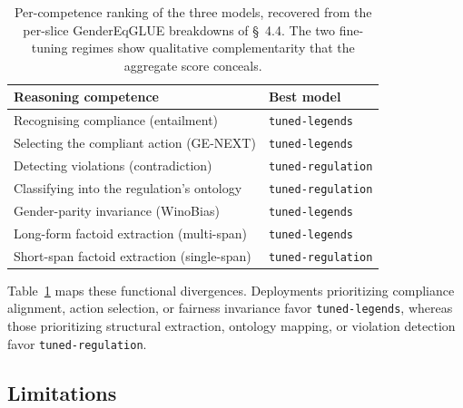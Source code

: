 \documentclass[pdflatex,sn-mathphys-num]{sn-jnl}%
\theoremstyle{thmstyleone}%
\theoremstyle{thmstyletwo}%
\theoremstyle{thmstylethree}%
\begin{document}
\begin{table}[htbp]
\centering
\caption{Per-competence ranking of the three models, recovered from the per-slice GenderEqGLUE breakdowns of \S~4.4. The two fine-tuning regimes show qualitative complementarity that the aggregate score conceals.}
\label{tab:competence_map}
\vspace{2mm}
\begin{tabular}{ll}
\toprule
\textbf{Reasoning competence} & \textbf{Best model} \\
\midrule
Recognising compliance (entailment) & \texttt{tuned-legends} \\
Selecting the compliant action (GE-NEXT) & \texttt{tuned-legends} \\
Detecting violations (contradiction) & \texttt{tuned-regulation} \\
Classifying into the regulation's ontology & \texttt{tuned-regulation} \\
Gender-parity invariance (WinoBias) & \texttt{tuned-legends} \\
Long-form factoid extraction (multi-span) & \texttt{tuned-legends} \\
Short-span factoid extraction (single-span) & \texttt{tuned-regulation} \\
\bottomrule
\end{tabular}
\end{table}

Table~\ref{tab:competence_map} maps these functional divergences. Deployments
prioritizing compliance alignment, action selection, or fairness invariance
favor \texttt{tuned-legends}, whereas those prioritizing structural extraction,
ontology mapping, or violation detection favor \texttt{tuned-regulation}.

\subsection{Limitations}
\end{document}
